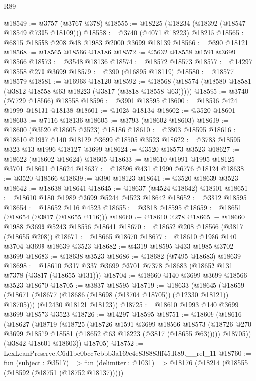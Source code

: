 \begin{lexlean}{R89}
\begin{coremodule}
@18549 := @3757 (@3767 @378)
@18555 := @18225 (@18234 (@18392 (@18547 @18549 @7305 @18109)))
@18558 := @3740 (@4071 @18223) @18215
@18565 := @6815 @18558 @208 @48 @1983 @2000 @3699 @18139
@18566 := @390 @18121
@18568 := @18565 @18566 @18186
@18572 := @5632 @18558 @1591 @3699 @18566
@18573 := @3548 @18136
@18574 := @18572 @18573
@18577 := @14297 @18558 @270 @3699
@18579 := @390 (@16895 @18119)
@18580 := @18577 @18579
@18581 := @16968 @18120
@18592 := @18568 (@18574 (@18580 @18581 (@3812 @18558 @63 @18223 (@3817 (@3818 @18558 @63)))))
@18595 := @3740 (@7729 @18566) @18558
@18596 := @3901 @18595
@18600 := @18596 @424 @1999 @18131 @18138
@18601 := @1028 @18134
@18602 := @3520 @18601
@18603 := @7116 @18136
@18605 := @3793 (@18602 @18603)
@18609 := @18600 (@3520 @18605 @3523) @18186
@18610 := @3803 @18595
@18616 := @18610 @1997 @140 @18129 @3699 @18605 @3523
@18622 := @3783 @18595 @323 @13 @1996 @18127 @3699
@18624 := @3520 @18573 @3523
@18627 := @18622 (@18602 @18624) @18605
@18633 := @18610 @1991 @1995 @18125 @3701 @18601 @18624
@18637 := @18596 @431 @1990 @6776 @18124
@18638 := @3520 @18566
@18639 := @390 @18123
@18641 := @3520 @18639 @3523
@18642 := @18638 @18641
@18645 := @18637 (@4524 @18642) @18601
@18651 := @18610 @180 @1989 @3699 @5244 @4523 @18642
@18652 := @3812 @18595
@18654 := @18652 @116 @4523
@18655 := @3818 @18595
@18659 := @18651 (@18654 (@3817 (@18655 @116)))
@18660 := @18610 @278
@18665 := @18660 @1988 @3699 @5243 @18566 @18641
@18670 := @18652 @208 @18566 (@3817 (@18655 @208))
@18671 := @18665 @18670
@18677 := @18610 @1986 @140 @3704 @3699 @18639 @3523
@18682 := @4319 @18595 @433 @1985 @3702 @3699
@18683 := @18638 @3523
@18686 := @18682 (@7495 @18683) @18639
@18698 := @18610 @317 @337 @3699 @3701 @7378 @18683 (@18652 @131 @7378 (@3817 (@18655 @131)))
@18704 := @18660 @140 @3699 @3699 @18566 @3523 @18670
@18705 := @3837 @18595
@18719 := @18633
    (@18645
      (@18659 (@18671 (@18677 (@18686 (@18698 (@18704 @18705)) (@12330 @18121)) @18705)))
      (@12430 @18121 @18123))
@18725 := @18610 @1993 @140 @3699 @3699 @18573 @3523
@18726 := @14297 @18595
@18751 := @18609
    (@18616
      (@18627
        (@18719
          (@18725
            (@18726
              @1591
              @3699
              @18566
              @18573
              (@18726 @270 @3699 @18579 @18581 (@18652 @63 @18223 (@3817 (@18655 @63)))))
            @18705))
        (@3842 @18601 @18603))
      @18705)
@18752 := LexLeanPreserve.C6d1bc0bcc7cbbb3a169c4e838883ff45.R89.__rel_11
@18760 := fun (subject : @3517) =>
  fun (delimiter : @1031) => @18176 (@18214 (@18555 (@18592 (@18751 (@18752 @18137)))))

\end{coremodule}
\end{lexlean}

